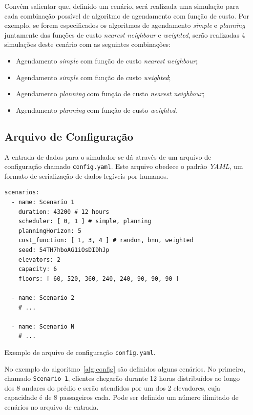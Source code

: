Convém salientar que, definido um cenário, será realizada uma simulação para cada
combinação possível de algoritmo de agendamento com função de custo. Por
exemplo, se forem especificados os algoritmos de agendamento \textit{simple} e
\textit{planning} juntamente das funções de custo \textit{nearest neighbour} e
\textit{weighted}, serão realizadas 4 simulações deste cenário com as seguintes
combinações:

\begin{itemize}
  \item Agendamento \textit{simple} com função de custo \textit{nearest neighbour};
  \item Agendamento \textit{simple} com função de custo \textit{weighted};
  \item Agendamento \textit{planning} com função de custo \textit{nearest neighbour};
  \item Agendamento \textit{planning} com função de custo \textit{weighted}.
\end{itemize}

\subsection{\label{model:scenario:config}Arquivo de Configuração}

A entrada de dados para o simulador se dá através de um arquivo de configuração
chamado \texttt{config.yaml}. Este arquivo obedece o padrão \textit{YAML}, um
formato de serialização de dados legíveis por humanos.

\begin{algorithm}[htb]
  \centering
    \begin{verbatim}
scenarios:
  - name: Scenario 1
    duration: 43200 # 12 hours
    scheduler: [ 0, 1 ] # simple, planning
    planningHorizon: 5
    cost_function: [ 1, 3, 4 ] # randon, bnn, weighted
    seed: 54TH7hboAG1iOsDIDhJp
    elevators: 2
    capacity: 6
    floors: [ 60, 520, 360, 240, 240, 90, 90, 90 ]

  - name: Scenario 2
    # ...

  - name: Scenario N
    # ...
    \end{verbatim}
  \caption{Exemplo de arquivo de configuração \texttt{config.yaml}.}
  \label{alg:config}
\end{algorithm}

No exemplo do algoritmo~\ref{alg:config} são definidos alguns cenários. No
primeiro, chamado \texttt{Scenario 1}, clientes chegarão durante 12 horas
distribuídos ao longo dos 8 andares do prédio e serão atendidos por um dos 2
elevadores, cuja capacidade é de 8 passageiros cada. Pode ser definido um
número ilimitado de cenários no arquivo de entrada.

